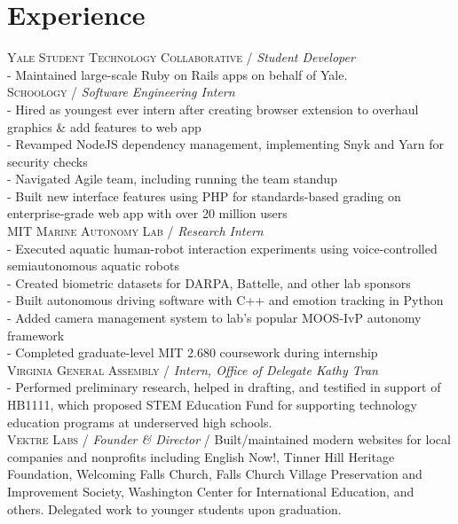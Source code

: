 \documentclass[10pt, a4paper]{article}
\newcommand{\years}[1]{\marginnote{\scriptsize #1}}
\begin{document}
\section*{Experience}
\years{2019-}\textsc{Yale Student Technology Collaborative} / \textit{Student Developer}\\
- Maintained large-scale Ruby on Rails apps on behalf of Yale.\\
\years{2019}\textsc{Schoology} / \textit{Software Engineering Intern}\\
- Hired as youngest ever intern after creating browser extension to overhaul graphics \& add features to web app\\
- Revamped NodeJS dependency management, implementing Snyk and Yarn for security checks\\
- Navigated Agile team, including running the team standup\\
- Built new interface features using PHP for standards-based grading on enterprise-grade web app with over 20 million users\\
\years{2018}\textsc{MIT Marine Autonomy Lab} / \textit{Research Intern}\\
- Executed aquatic human-robot interaction experiments using voice-controlled semiautonomous aquatic robots\\
- Created biometric datasets for DARPA, Battelle, and other lab sponsors\\
- Built autonomous driving software with C++ and emotion tracking in Python \\
- Added camera management system to lab's popular MOOS-IvP autonomy framework\\
- Completed graduate-level MIT 2.680 coursework during internship\\
\years{2018}\textsc{Virginia General Assembly} / \textit{Intern, Office of Delegate Kathy Tran}\\
- Performed preliminary research, helped in drafting, and testified in support of HB1111, which proposed STEM Education Fund for supporting technology education programs at underserved high schools.\\
\years{2016-2019}\textsc{Vektre Labs} / \textit{Founder \& Director} / Built/maintained modern websites for local companies and nonprofits including English Now!, Tinner Hill Heritage Foundation, Welcoming Falls Church, Falls Church Village Preservation and Improvement Society, Washington Center for International Education, and others. Delegated work to younger students upon graduation.\\
\end{document}
